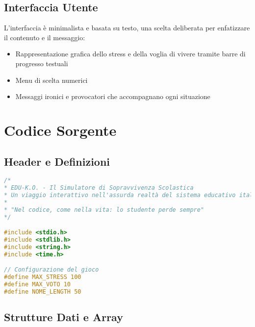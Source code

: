 \documentclass[a4paper,12pt]{article}
\begin{document}
\subsection{Interfaccia Utente}

L'interfaccia è minimalista e basata su testo, una scelta deliberata per enfatizzare il contenuto e il messaggio:

\begin{itemize}
    \item Rappresentazione grafica dello stress e della voglia di vivere tramite barre di progresso testuali
    \item Menu di scelta numerici
    \item Messaggi ironici e provocatori che accompagnano ogni situazione
\end{itemize}

\section{Codice Sorgente}

\subsection{Header e Definizioni}

\begin{lstlisting}[language=C, caption=Header e definizioni]
/*
* EDU-K.O. - Il Simulatore di Sopravvivenza Scolastica
* Un viaggio interattivo nell'assurda realtà del sistema educativo italiano
* 
* "Nel codice, come nella vita: lo studente perde sempre"
*/

#include <stdio.h>
#include <stdlib.h>
#include <string.h>
#include <time.h>

// Configurazione del gioco
#define MAX_STRESS 100
#define MAX_VOTO 10
#define NOME_LENGTH 50
\end{lstlisting}

\subsection{Strutture Dati e Array}
\end{document}
